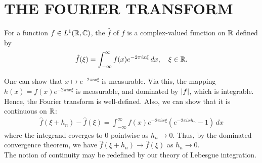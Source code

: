 \chapter{THE FOURIER TRANSFORM}

\begin{definition}
    For a function $f \in L^{1}(\mathbb{R},\mathbb{C})$, the  $\hat{f}$ of $f$ is a complex-valued function on $\mathbb{R}$ defined by
    \begin{align}
        \hat{f}(\xi) = \int_{-\infty}^{\infty} f(x) e^{-2 \pi i x \xi} \, dx, \quad \xi \in \mathbb{R}.
    \end{align}
\end{definition}

One can show that $x \mapsto e^{-2 \pi i x \xi}$ is measurable. Via this, the mapping $h(x) = f(x) e^{-2 \pi i x \xi}$ is measurable, and dominated by $\left| f \right|$, which is integrable. Hence, the Fourier transform is well-defined. Also, we can show that it is continuous on $\mathbb{R}$:
\begin{align}
    \hat{f}(\xi+h_{n})-\hat{f}(\xi) = \int_{-\infty}^{\infty} f(x) e^{-2 \pi i x \xi} (e^{-2 \pi i x h_{n}} - 1) \, dx
\end{align}
where the integrand coverges to $0$ pointwise as $h_{n} \to 0$. Thus, by the dominated convergence theorem, we have $\hat{f}(\xi+h_{n}) \to \hat{f}(\xi)$ as $h_{n} \to 0$. 
\\

The notion of continuity may be redefined by our theory of Lebesgue integration.

